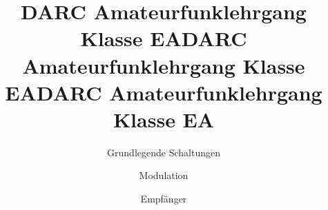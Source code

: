 \documentclass[aspectratio = 169]{beamer}
\begin{document}
\title{DARC Amateurfunklehrgang Klasse EA}
\author{Grundlegende Schaltungen}
\begin{frame}
\maketitle
\end{frame}

























\title{DARC Amateurfunklehrgang Klasse EA}
\author{Modulation}
\begin{frame}
\maketitle
\end{frame}












\title{DARC Amateurfunklehrgang Klasse EA}
\author{Empfänger}
\begin{frame}
\maketitle
\end{frame}



























\end{document}
